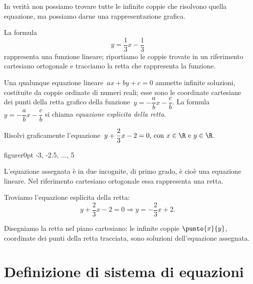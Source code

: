 \begin{esempio}
In verità non possiamo trovare tutte le infinite coppie che risolvono
quella equazione, ma possiamo darne una rappresentazione grafica.

La formula \[y=\frac{1}{3}x-\frac{1}{3}\] rappresenta una funzione
lineare; riportiamo le coppie trovate in un riferimento cartesiano
ortogonale e tracciamo la retta che rappresenta la funzione.

Una qualunque equazione lineare~\(ax+by+c=0\) ammette infinite
soluzioni, costituite da coppie ordinate di numeri reali; esse sono le
coordinate cartesiane dei punti della retta grafico della 
funzione~\(y=-{\dfrac{a}{b}}x-\dfrac{c}{b}\).
La formula~\(y=-{\dfrac{a}{b}}x-\dfrac{c}{b}\) si chiama \emph{equazione 
esplicita 
della retta}.
\end{esempio}

\newpage %

\begin{esempio}
 Risolvi graficamente l'equazione~\(y+\dfrac{2}{3}x-2=0\text{, con } 
x\in\R\text{ e }y\in\R\).
\end{esempio}

\begin{wrapfloat}{figure}{r}{0pt}
                    {-3, -2.5, ..., 5}
% 
\end{wrapfloat}

L'equazione assegnata è in due incognite, di primo
grado, è cioè una equazione lineare. Nel riferimento cartesiano
ortogonale essa rappresenta una retta.

Troviamo l'equazione esplicita della retta:
\[y+\frac{2}{3}x-2=0\Rightarrow y=-{\frac{2}{3}}x+2.\]

% 

Disegniamo la retta nel piano cartesiano: le infinite coppie
\(\punto{x}{y}\), 
coordinate dei punti della retta tracciata, sono soluzioni
dell'equazione assegnata.


\section{Definizione di sistema di equazioni}
\label{sec:sist_definizione}

